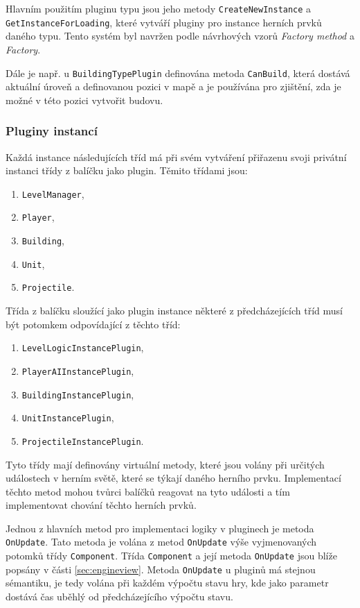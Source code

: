 Hlavním použitím pluginu typu jsou jeho metody \texttt{CreateNewInstance} a \texttt{GetInstanceForLoading}, které vytváří pluginy pro instance herních prvků daného typu. Tento systém byl navržen podle návrhových vzorů \textit{Factory method} a \textit{Factory}.

Dále je např. u \texttt{BuildingTypePlugin} definována metoda \texttt{CanBuild}, která dostává aktuální úroveň a definovanou pozici v mapě a je používána pro zjištění, zda je možné v této pozici vytvořit budovu.

\subsubsection{Pluginy instancí}
Každá instance následujících tříd má při svém vytváření přiřazenu svoji privátní instanci třídy z balíčku jako plugin. Těmito třídami jsou:
\begin{enumerate}
	\item\texttt{LevelManager}, 
	\item\texttt{Player}, 
	\item\texttt{Building},
	\item\texttt{Unit},
	\item\texttt{Projectile}.
\end{enumerate}
   
Třída z balíčku sloužící jako plugin instance některé z předcházejících tříd musí být potomkem odpovídající z těchto tříd:

\begin{enumerate}
	\item\texttt{LevelLogicInstancePlugin}, 
	\item\texttt{PlayerAIInstancePlugin}, 
	\item\texttt{BuildingInstancePlugin}, 
	\item\texttt{UnitInstancePlugin}, 
	\item\texttt{ProjectileInstancePlugin}.
\end{enumerate}

Tyto třídy mají definovány virtuální metody, které jsou volány při určitých událostech v herním světě, které se týkají daného herního prvku. Implementací těchto metod mohou tvůrci balíčků reagovat na tyto události a tím implementovat chování těchto herních prvků.

Jednou z hlavních metod pro implementaci logiky v pluginech je metoda \texttt{OnUpdate}. Tato metoda je volána z metod \texttt{OnUpdate} výše vyjmenovaných potomků třídy \texttt{Component}. Třída \texttt{Component} a její metoda \texttt{OnUpdate} jsou blíže popsány v části \ref{sec:engineview}. Metoda \texttt{OnUpdate} u pluginů má stejnou sémantiku, je tedy volána při každém výpočtu stavu hry, kde jako parametr dostává čas uběhlý od předcházejícího výpočtu stavu.

